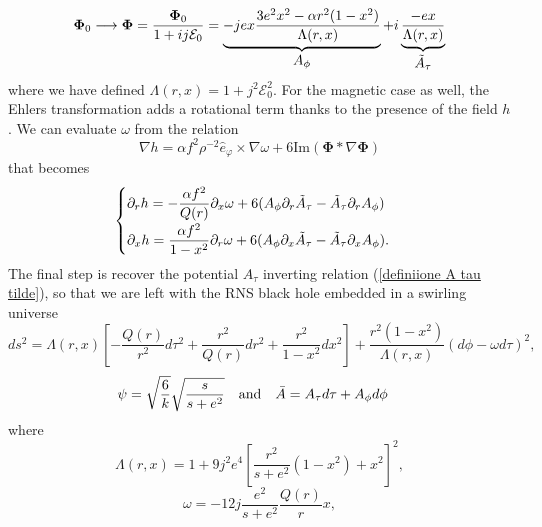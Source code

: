 \begin{equation}
    \boldsymbol{\Phi}_0 \longrightarrow \boldsymbol{\Phi} = \frac{\boldsymbol{\Phi}_0}{1+ij\mathcal{E}_0} = \underbrace{-jex\frac{3e^2x^2-\alpha r^2(1-x^2)}{\Lambda(r,x)}}_{\displaystyle A_{\phi}} + i \underbrace{\frac{-ex}{\Lambda(r,x)}}_{\displaystyle \Tilde{A}_{\tau}}
\end{equation}
where we have defined $\Lambda(r,x) = 1+j^2\mathcal{E}_0^2$. For the magnetic case as well, the Ehlers transformation adds a rotational term thanks to the presence of the field $h$. We can evaluate $\omega$ from the relation 
\begin{equation}
    \nabla h = \alpha f^2 \rho^{-2}\hat{e}_{\varphi}\times\nabla\omega + 6 \mathrm{Im}(\boldsymbol{\Phi}*\nabla\boldsymbol{\Phi})
    \label{definizione h magnetica}
\end{equation}
that becomes 
\begin{equation*}
    \begin{aligned}
        \begin{cases}
           \displaystyle\partial_r h = -\frac{\alpha f^2}{Q(r)}\partial_x\omega +6(A_{\phi}\partial_r\Tilde{A}_{\tau}-\Tilde{A}_{\tau}\partial_rA_{\phi}) \\[0.7em]
           \displaystyle\partial_x h = \frac{\alpha f^2}{1-x^2}\partial_r\omega +6(A_{\phi}\partial_x\Tilde{A}_{\tau}-\Tilde{A}_{\tau}\partial_xA_{\phi}). \\
        \end{cases}
    \end{aligned}
\end{equation*}
The final step is recover the potential $A_{\tau}$ inverting relation (\ref{definiione A tau tilde}), so that we are left with the RNS black hole embedded in a swirling universe
\begin{equation}
    ds^2=\Lambda(r,x)\left[-\frac{Q(r)}{r^2}d\tau^2 
    + \frac{r^2}{Q(r)}dr^2+\frac{r^2}{1-x^2}dx^2\right]+\frac{r^2(1-x^2)}{\Lambda(r,x)}(d\phi-\omega d\tau)^2,
    \label{RNS in swirling universe}
\end{equation}
\begin{align}
  \psi & = \sqrt{\frac{6}{k}}\sqrt{\frac{s}{s+e^2}} &\text{and}& & \Bar{A} &= A_{\tau}d\tau +A_{\phi}d\phi  \notag
\end{align}
where
\begin{equation}
    \Lambda(r,x) = 1+9j^2e^4\left[\frac{r^2}{s+e^2}(1-x^2)+x^2\right]^2,
\end{equation}
\begin{equation}
    \omega = -12j\frac{e^2}{s+e^2}\frac{Q(r)}{r}x,
\end{equation}
